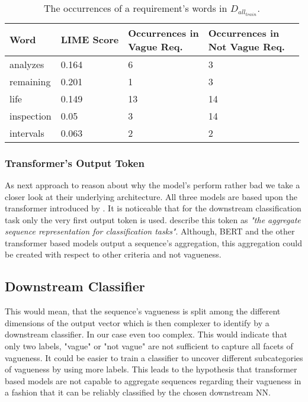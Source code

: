 \begin{table}[htpb]
    \centering
    \begin{tabular}{l | l l l l }
        \toprule
         Word & \ac{LIME} Score & \makecell{Occurrences in\\Vague Req.} & \makecell{Occurrences in\\Not Vague Req.} \\
        \hline
        analyzes & 0.164 & 6 & 3 \\
        remaining & 0.201 & 1 & 3  \\
        life & 0.149 & 13 & 14\\
        inspection & 0.05 & 3 & 14 \\
        intervals & 0.063 & 2 & 2 \\
        \bottomrule
    \end{tabular}
    \caption[Study Interpretation: Word Occurrences]{The occurrences of a requirement's words in $D_{all_{train}}$.}\label{tab:study:interpretation:LIME}
\end{table}

\subsubsection{Transformer's Output Token}
\label{chp:study:sec:interpretation:subsec:causes:transformer_ouput_token}
As next approach to reason about why the model's perform rather bad we take a closer look at their underlying architecture.
All three models are based upon the transformer introduced by \textcite{Vaswani:2017}.
It is noticeable that for the downstream classification task only the very first output token is used.
\Textcite{Devlin:2018} describe this token as \textit{"the aggregate sequence representation for classification tasks"}.
Although, \ac{BERT} and the other transformer based models output a sequence's aggregation, this aggregation could be created with respect to other criteria and not vagueness.


\subsection{Downstream Classifier}
\label{chp:study:sec:interpretation:subsec:causes:downstream_classifier}
This would mean, that the sequence's vagueness is split among the different dimensions of the output vector which is then complexer to identify by a downstream classifier.
In our case even too complex.
This would indicate that only two labels, "vague" or "not vague" are not sufficient to capture all facets of vagueness.
It could be easier to train a  classifier to uncover different subcategories of vagueness by using more labels.
This leads to the hypothesis that transformer based models are not capable to aggregate sequences regarding their vagueness in a fashion that it can be reliably classified by the chosen downstream \ac{NN}.


